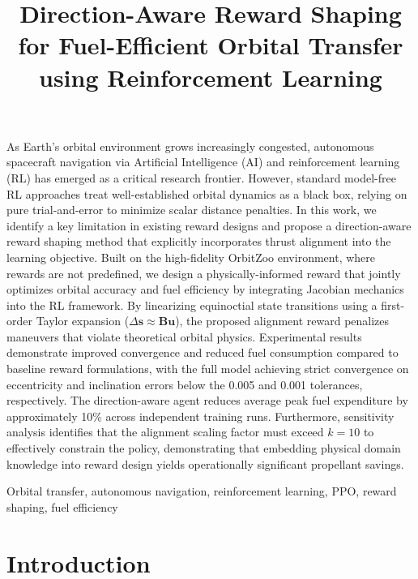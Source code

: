 \documentclass[paper]{ieice}
\title[Direction-Aware Reward Shaping for Fuel-Efficient Orbital Transfer using Reinforcement Learning]
      {Direction-Aware Reward Shaping for Fuel-Efficient Orbital Transfer using Reinforcement Learning}
\begin{document}
\maketitle

\begin{summary}
As Earth's orbital environment grows increasingly congested, autonomous spacecraft navigation via Artificial Intelligence (AI) and reinforcement learning (RL) has emerged as a critical research frontier. However, standard model-free RL approaches treat well-established orbital dynamics as a black box, relying on pure trial-and-error to minimize scalar distance penalties. In this work, we identify a key limitation in existing reward designs and propose a direction-aware reward shaping method that explicitly incorporates thrust alignment into the learning objective. Built on the high-fidelity OrbitZoo environment, where rewards are not predefined, we design a physically-informed reward that jointly optimizes orbital accuracy and fuel efficiency by integrating Jacobian mechanics into the RL framework. By linearizing equinoctial state transitions using a first-order Taylor expansion ($\Delta \mathbf{s} \approx \mathbf{B} \mathbf{u}$), the proposed alignment reward penalizes maneuvers that violate theoretical orbital physics. Experimental results demonstrate improved convergence and reduced fuel consumption compared to baseline reward formulations, with the full model achieving strict convergence on eccentricity and inclination errors below the 0.005 and 0.001 tolerances, respectively. The direction-aware agent reduces average peak fuel expenditure by approximately 10\% across independent training runs. Furthermore, sensitivity analysis identifies that the alignment scaling factor must exceed $k = 10$ to effectively constrain the policy, demonstrating that embedding physical domain knowledge into reward design yields operationally significant propellant savings.
\end{summary}
\begin{keywords}
Orbital transfer, autonomous navigation, reinforcement learning, PPO, reward shaping, fuel efficiency
\end{keywords}

\section{Introduction}
\label{intro}
\end{document}

